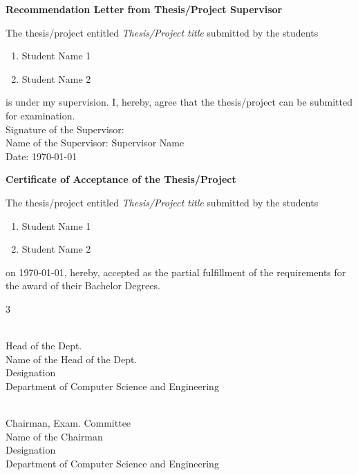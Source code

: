 \documentclass{standalone}
\begin{document}
\begin{titlepage}
\newpage
\begin{center}
	\textbf{\huge Recommendation Letter from Thesis/Project Supervisor}
\end{center}
\noindent
The thesis/project entitled \emph{Thesis/Project title} submitted by the students
\begin{enumerate}
	\item Student Name 1
	\item Student Name 2
\end{enumerate}
is under my supervision. I, hereby, agree that the thesis/project can be submitted for examination.\\

\vspace{2.0cm}
\noindent
Signature of the Supervisor: \\
Name of the Supervisor:  Supervisor Name\\%
Date: \today
				
\newpage
	\begin{center}
    	\textbf{\huge Certificate of Acceptance of the Thesis/Project}
	\end{center}
\noindent
The thesis/project entitled \emph{Thesis/Project title}
submitted by the students
\begin{enumerate}
	\item Student Name 1
	\item Student Name 2
\end{enumerate}
on \today  \is, hereby, accepted as the partial fulfillment of the requirements for the award of their Bachelor Degrees.
\vspace{2.0cm}

\begin{multicols}{3}
	\begin{flushleft}
    	\hrulefill \\
	    {\hspace{0.3mm}Head of the Dept.\\\hspace{0.3mm}Name of the Head of the Dept. \\
	    \hspace{0.3mm}Designation\\\hspace{0.3mm}Department of Computer Science and Engineering}\\
	\end{flushleft}
		
	\begin{flushleft}
		\hrulefill \\
		{\hspace{0.5mm}Chairman, Exam. Committee\\\hspace{0.5mm}Name of the Chairman\\
		\hspace{0.5mm}Designation\\\hspace{0.5mm}Department of Computer Science and Engineering}\\
	\end{flushleft}
				

\end{multicols}
\end{titlepage}
\end{document}
